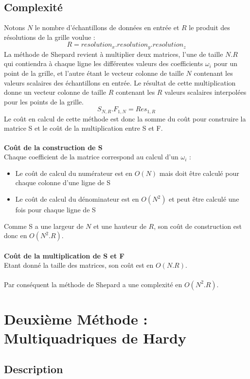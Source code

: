 \documentclass[a4paper,9pt]{article}
\begin{document}
\subsection{Complexité}
\label{subsec:shepard_complexite}
Notons $N$ le nombre d'échantillons de données en entrée et $R$ le produit des résolutions de la grille voulue :
$$R = resolution_{x}.resolution_{y}.resolution_{z}$$
La méthode de Shepard revient à multiplier deux matrices, l'une de taille $N.R$ qui contiendra à chaque ligne les différentes valeurs des coefficients $\omega_{i}$ pour un point de la grille, et l'autre étant le vecteur colonne de taille $N$ contenant les valeurs scalaires des échantillons en entrée. Le résultat de cette multiplication donne un vecteur colonne de taille $R$ contenant les $R$ valeurs scalaires interpolées pour les points de la grille.
$$S_{N,R}.F_{1,N}=Res_{1,R}$$
Le coût en calcul de cette méthode est donc la somme du coût pour construire la matrice S et le coût de la multiplication entre S et F.\\\\
\textbf{Coût de la construction de S}\\
Chaque coefficient de la matrice correspond au calcul d'un $\omega_{i}$ :
\begin{itemize}
\item Le coût de calcul du numérateur est en $O(N)$ mais doit être calculé pour chaque colonne d'une ligne de S
\item Le coût de calcul du dénominateur est en $O(N^{2})$ et peut être calculé une fois pour chaque ligne de S
\end{itemize}
Comme S a une largeur de $N$ et une hauteur de $R$, son coût de construction est donc en $O(N^{2}.R)$.\\\\
\textbf{Coût de la multiplication de S et F}\\
Etant donné la taille des matrices, son coût est en $O(N.R)$.\\\\
Par conséquent la méthode de Shepard a une complexité en \textbf{$O(N^{2}.R)$}.


\section{Deuxième Méthode : Multiquadriques de Hardy}
\label{sec:hardy}

\subsection{Description}
\label{subsec:hardy_description}
\end{document}
